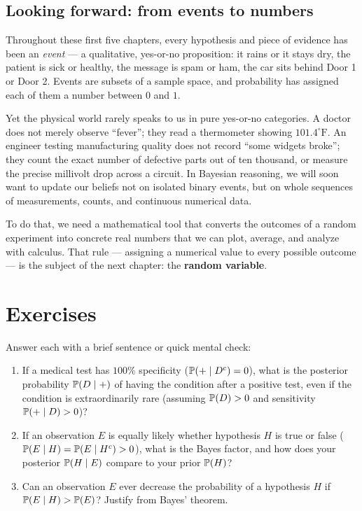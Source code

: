 \subsection{Looking forward: from events to numbers}

Throughout these first five chapters, every hypothesis and piece of evidence has been an
\emph{event} --- a qualitative, yes-or-no proposition: it rains or it stays dry, the
patient is sick or healthy, the message is spam or ham, the car sits behind Door 1 or Door
2. Events are subsets of a sample space, and probability has assigned each of them a number
between $0$ and $1$.

Yet the physical world rarely speaks to us in pure yes-or-no categories. A doctor does not
merely observe ``fever''; they read a thermometer showing $101.4^\circ\text{F}$. An
engineer testing manufacturing quality does not record ``some widgets broke''; they
count the exact number of defective parts out of ten thousand, or measure the precise
millivolt drop across a circuit. In Bayesian reasoning, we will soon want to update our
beliefs not on isolated binary events, but on whole sequences of measurements, counts,
and continuous numerical data.

To do that, we need a mathematical tool that converts the outcomes of a
random experiment into concrete real numbers that we can plot, average, and analyze with
calculus. That rule --- assigning a numerical value to every possible outcome --- is the
subject of the next chapter: the \textbf{random variable}.

\section{Exercises}
\label{ch05:exercises}

\begin{exercise}
\label{ch05:exer-mental}
Answer each with a brief sentence or quick mental check:
\begin{enumerate}
\item If a medical test has $100\%$ specificity ($\P(+ \given D^c) = 0$), what is the posterior probability $\P(D \given +)$ of having the condition after a positive test, even if the condition is extraordinarily rare (assuming $\P(D) > 0$ and sensitivity $\P(+ \given D) > 0$)?
\item If an observation $E$ is equally likely whether hypothesis $H$ is true or false ($\P(E \given H) = \P(E \given H^c) > 0$), what is the Bayes factor, and how does your posterior $\P(H \given E)$ compare to your prior $\P(H)$?
\item Can an observation $E$ ever decrease the probability of a hypothesis $H$ if $\P(E \given H) > \P(E)$? Justify from Bayes' theorem.
\end{enumerate}
\end{exercise}

